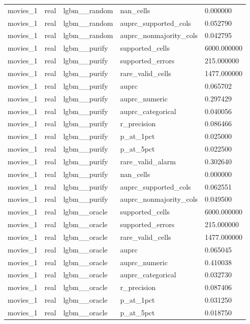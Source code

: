 \begin{tabular}{lllll}
movies\_1 & real & lgbm\_\_random & nan\_cells & 0.000000 \\
movies\_1 & real & lgbm\_\_random & auprc\_supported\_cols & 0.052790 \\
movies\_1 & real & lgbm\_\_random & auprc\_nonmajority\_cols & 0.042795 \\
movies\_1 & real & lgbm\_\_purify & supported\_cells & 6000.000000 \\
movies\_1 & real & lgbm\_\_purify & supported\_errors & 215.000000 \\
movies\_1 & real & lgbm\_\_purify & rare\_valid\_cells & 1477.000000 \\
movies\_1 & real & lgbm\_\_purify & auprc & 0.065702 \\
movies\_1 & real & lgbm\_\_purify & auprc\_numeric & 0.297429 \\
movies\_1 & real & lgbm\_\_purify & auprc\_categorical & 0.040056 \\
movies\_1 & real & lgbm\_\_purify & r\_precision & 0.086466 \\
movies\_1 & real & lgbm\_\_purify & p\_at\_1pct & 0.025000 \\
movies\_1 & real & lgbm\_\_purify & p\_at\_5pct & 0.022500 \\
movies\_1 & real & lgbm\_\_purify & rare\_valid\_alarm & 0.302640 \\
movies\_1 & real & lgbm\_\_purify & nan\_cells & 0.000000 \\
movies\_1 & real & lgbm\_\_purify & auprc\_supported\_cols & 0.062551 \\
movies\_1 & real & lgbm\_\_purify & auprc\_nonmajority\_cols & 0.049500 \\
movies\_1 & real & lgbm\_\_oracle & supported\_cells & 6000.000000 \\
movies\_1 & real & lgbm\_\_oracle & supported\_errors & 215.000000 \\
movies\_1 & real & lgbm\_\_oracle & rare\_valid\_cells & 1477.000000 \\
movies\_1 & real & lgbm\_\_oracle & auprc & 0.065045 \\
movies\_1 & real & lgbm\_\_oracle & auprc\_numeric & 0.410038 \\
movies\_1 & real & lgbm\_\_oracle & auprc\_categorical & 0.032730 \\
movies\_1 & real & lgbm\_\_oracle & r\_precision & 0.087406 \\
movies\_1 & real & lgbm\_\_oracle & p\_at\_1pct & 0.031250 \\
movies\_1 & real & lgbm\_\_oracle & p\_at\_5pct & 0.018750 \\

\end{tabular}
